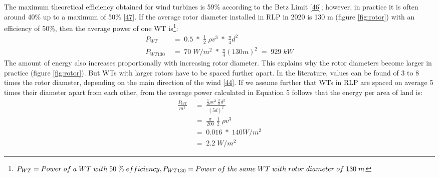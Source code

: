 \documentclass[a4paper,11pt]{article}
\begin{document}
The maximum theoretical efficiency obtained for wind turbines is 59\% according to the Betz Limit {[}\protect\hyperlink{ref-A.Betz.1920}{46}{]}; however, in practice it is often around 40\% up to a maximum of 50\% {[}\protect\hyperlink{ref-WindwartsEnergieausdemNorden.2021}{47}{]}. If the average rotor diameter installed in RLP in 2020 is 130 m (figure \ref{fig:rotor}) with an efficiency of 50\%, then the average power of one WT is\footnote{\(P_{WT}=Power\; of\; a\; WT\; with\; 50\; \%\; efficiency,\;\\ P_{WT130}=Power\; of\; the\; same\; WT\; with\; rotor\; diameter\; of\; 130\; m\)}:
\begin{equation}
\begin{split}
P_{WT}\; & =\; 0.5\; *\; \frac{1}{2}\; \rho v^3\; *\; \frac{\pi}{4}d^2 \\
P_{WT130}\; & =\; 70\; W/m^2\; *\; \frac{\pi}{4}(130 m)^2\; =\; 929\; kW
\end{split}
\end{equation}
The amount of energy also increases proportionally with increasing rotor diameter. This explains why the rotor diameters become larger in practice (figure \ref{fig:rotor}). But WTs with larger rotors have to be spaced further apart. In the literature, values can be found of 3 to 8 times the rotor diameter, depending on the main direction of the wind {[}\protect\hyperlink{ref-DavidJCMacKay.2009}{44}{]}. If we assume further that WTs in RLP are spaced on average 5 times their diameter apart from each other, from the average power calculated in Equation 5 follows that the energy per area of land is:
\begin{equation}
\begin{split}
\frac{P_{WT}}{m^2}\; & =\; \frac{\frac{1}{2} \rho v^3\; \frac{\pi}{8}d^2}{(5d)^2} \\
 & =\; \frac{\pi}{200}\; \frac{1}{2}\; \rho v^3 \\
 & =\; 0.016\; *\; 140 W/m^2 \\
 & =\; 2.2\; W/m^2
\end{split}
\end{equation}
\end{document}
